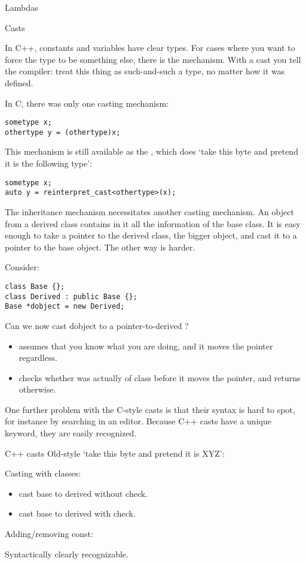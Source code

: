  {Lambdas}
\label{sec:lambda}


 {Casts}
\label{sec:cast}

In C++, constants and variables have clear types. For cases where you
want to force the type to be something else, there is the
 mechanism. With a cast you tell the compiler:
treat this thing as such-and-such a type, no matter how it was
defined.

In C, there was only one casting mechanism:
\begin{verbatim}
sometype x;
othertype y = (othertype)x;
\end{verbatim}
This mechanism is still available as the
, which does `take this byte and pretend
it is the following type':
\begin{verbatim}
sometype x;
auto y = reinterpret_cast<othertype>(x);
\end{verbatim}

The inheritance mechanism necessitates another casting mechanism.
An object from a derived class contains in it all the information of
the base class. It is easy enough to take a pointer to the derived
class, the bigger object, and cast it to a pointer to the base object.
The other way is harder.

Consider:
\begin{verbatim}
class Base {};
class Derived : public Base {};
Base *dobject = new Derived;
\end{verbatim}
Can we now cast dobject to a pointer-to-derived ?
\begin{itemize}
\item {} assumes that you know what you are
  doing, and it moves the pointer regardless.
\item {} checks whether  was
  actually of class  before it moves the pointer, and
  returns  otherwise.
\end{itemize}

\begin{remark}
  One further problem with the C-style casts is that their syntax is
  hard to spot, for instance by searching in an editor.
  Because C++ casts have a unique keyword, they are easily recognized.
\end{remark}

\begin{slide}{C++ casts}
  \label{sl:cpp-casts}
  Old-style `take this byte and pretend it is XYZ':
  
  Casting with classes:
  \begin{itemize}
  \item {} cast base to derived without check.
  \item {} cast base to derived with check.
  \end{itemize}
  Adding/removing const: 

  Syntactically clearly recognizable.
\end{slide}

